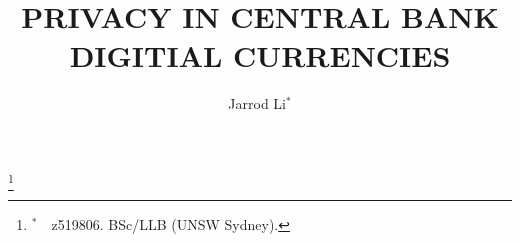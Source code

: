 \documentclass[12pt]{article}
\begin{document}
\thispagestyle{plain}
\thispagestyle{plain}
\renewcommand\footnotemark{}
\setlength\thanksmarkwidth{0.3em}
\setlength\thanksmargin{0.8em}

\title{\vspace{-25mm}\large{\textbf{\uppercase{Privacy in Central Bank Digitial Currencies}}}}
\date{}
\author{Jarrod Li$^*$}
\thanks{$^*$\ \ z519806. BSc/LLB (UNSW Sydney).}
\maketitle



\newpage
\tableofcontents
\newpage

\pagestyle{fancy}









\newpage


\end{document}

